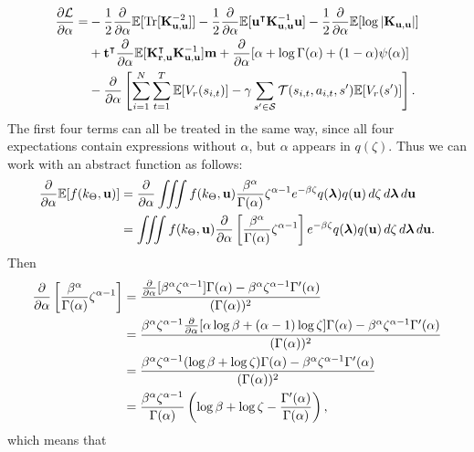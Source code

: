 \documentclass{mprop}
\theoremstyle{definition}
\DeclareMathOperator{\Tr}{Tr}
\begin{document}
\[
  \begin{split}
    \frac{\partial\mathcal{L}}{\partial\alpha} = &-
    \frac{1}{2}\da\mathbb{E}[\Tr[\Kuu^{-2}]] -
    \frac{1}{2}\da\mathbb{E}[\mathbf{u}^\intercal\Kuu^{-1}\mathbf{u}] -
    \frac{1}{2}\da\mathbb{E}[\log|\Kuu|] \\
    &+ \mathbf{t}^\intercal\da\mathbb{E}[\Kru^\intercal\Kuu^{-1}]\mathbf{m} +
    \da [\alpha + \log\Gamma(\alpha) + (1 - \alpha)\psi(\alpha)] \\
      &- \da \left[\sum_{i=1}^N \sum_{t=1}^T \mathbb{E}[V_r(s_{i,t})] -
        \gamma\sum_{s' \in \mathcal{S}} \mathcal{T}(s_{i,t}, a_{i,t},
        s')\mathbb{E}[V_r(s')] \right].
  \end{split}
\]
The first four terms can all be treated in the same way, since all four
expectations contain expressions without $\alpha$, but $\alpha$ appears in
$q(\zeta)$. Thus we can work with an abstract function as follows:
\[
  \begin{split}
    \frac{\partial}{\partial\alpha}\mathbb{E}[f(k_\Theta, \mathbf{u})] &= \frac{\partial}{\partial\alpha} \iiint f(k_\Theta, \mathbf{u})
    \frac{\beta^\alpha}{\Gamma(\alpha)} \zeta^{\alpha - 1} e^{-\beta\zeta}
    q(\bm\lambda) q(\mathbf{u})\,d\zeta\,d\bm\lambda\,d\mathbf{u} \\
    &= \iiint f(k_\Theta, \mathbf{u})
    \frac{\partial}{\partial\alpha} \left[ \frac{\beta^\alpha}{\Gamma(\alpha)} \zeta^{\alpha - 1} \right]
      e^{-\beta\zeta}
    q(\bm\lambda) q(\mathbf{u})\,d\zeta\,d\bm\lambda\,d\mathbf{u}.
  \end{split}
\]
Then
\[
  \begin{split}
    \frac{\partial}{\partial\alpha} \left[ \frac{\beta^\alpha}{\Gamma(\alpha)} \zeta^{\alpha - 1} \right] &=
    \frac{\frac{\partial}{\partial\alpha}[\beta^\alpha\zeta^{\alpha - 1}]\Gamma(\alpha) -
      \beta^\alpha\zeta^{\alpha - 1}\Gamma'(\alpha)}{(\Gamma(\alpha))^2} \\
    &= \frac{\beta^\alpha\zeta^{\alpha - 1}\frac{\partial}{\partial\alpha}[\alpha\log\beta + (\alpha -
      1)\log\zeta]\Gamma(\alpha) - \beta^\alpha\zeta^{\alpha -
        1}\Gamma'(\alpha)}{(\Gamma(\alpha))^2} \\
    &= \frac{\beta^\alpha\zeta^{\alpha - 1}(\log\beta + \log\zeta)\Gamma(\alpha)
      - \beta^\alpha\zeta^{\alpha - 1}\Gamma'(\alpha)}{(\Gamma(\alpha))^2} \\
    &= \frac{\beta^\alpha\zeta^{\alpha - 1}}{\Gamma(\alpha)}\left(\log\beta +
    \log\zeta - \frac{\Gamma'(\alpha)}{\Gamma(\alpha)}\right),
  \end{split}
\]
which means that
\end{document}
